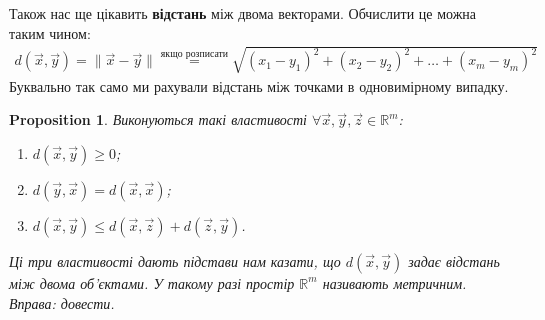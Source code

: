 \documentclass[a4paper, 10pt]{article}
\theoremstyle{theoremdd}
\theoremstyle{theoremdd}
\theoremstyle{theoremdd}
\theoremstyle{theoremdd}
\theoremstyle{theoremdd}
\theoremstyle{theoremdd}
\newtheorem{proposition}[theorem]{Proposition}
\theoremstyle{theoremdd}
\theoremstyle{theoremdd}
\theoremstyle{theoremdd}
\begin{document}
Також нас ще цікавить \textbf{відстань} між двома векторами. Обчислити це можна таким чином:
\begin{align*}
d(\vec{x},\vec{y}) = \| \vec{x} - \vec{y} \| \overset{\text{якщо розписати}}{=} \sqrt{(x_1-y_1)^2 + (x_2-y_2)^2 + \dots + (x_m-y_m)^2}
\end{align*}
Буквально так само ми рахували відстань між точками в одновимірному випадку.

\begin{proposition}
Виконуються такі властивості $\forall \vec{x},\vec{y},\vec{z} \in \mathbb{R}^m$:
\begin{enumerate}[nosep,wide=0pt,label={\arabic*)}]
\item $d(\vec{x},\vec{y}) \geq 0$;
\item $d(\vec{y},\vec{x}) = d(\vec{x},\vec{x})$;
\item $d(\vec{x},\vec{y}) \leq d(\vec{x},\vec{z}) + d(\vec{z},\vec{y})$.
\end{enumerate}
Ці три властивості дають підстави нам казати, що $d(\vec{x},\vec{y})$ задає відстань між двома об'єктами. У такому разі простір $\mathbb{R}^m$ називають метричним.\\
\textit{Вправа: довести.}
\end{proposition}
\end{document}
